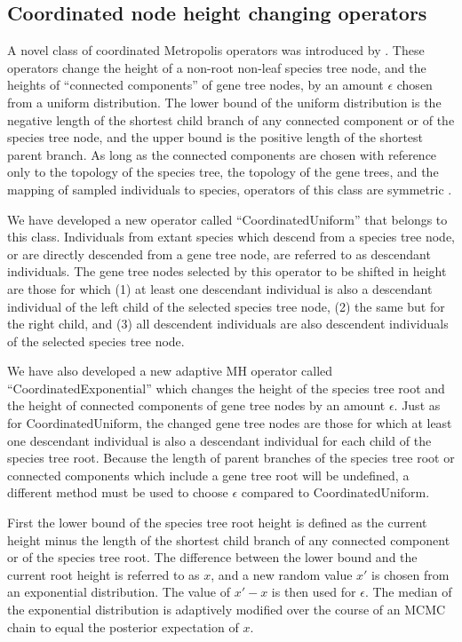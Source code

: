 \documentclass[nogrid]{MBE}%
\begin{document}
\subsection{Coordinated node height changing operators}

A novel class of coordinated Metropolis operators was introduced by
\cite{Jones2016}. These operators change the height of a non-root non-leaf
species tree node, and the heights of ``connected components'' of gene tree
nodes, by an amount $\epsilon$ chosen from a uniform distribution.
The lower bound of the uniform distribution is the negative length of
the shortest child branch of any connected component or of the species tree node,
and the upper bound is the positive length of the shortest parent branch. As
long as the connected components are chosen with reference only to the topology
of the species tree, the topology of the gene trees, and the mapping of
sampled individuals to species, operators of this class are symmetric
\citep{Jones2016}.

We have developed a new operator called ``CoordinatedUniform'' that belongs to
this class. Individuals from extant species which descend from a species tree
node, or are directly descended from a gene tree node, are referred to as
descendant individuals. The gene tree nodes selected by this operator to be shifted in height are those
for which (1) at least one descendant individual is also a descendant individual
of the left child of the selected species tree node, (2) the same but for the right child, and (3) all descendent
individuals are also descendent individuals of the selected species tree node.

We have also developed a new adaptive MH \citep{Andrieu2008} operator called
``CoordinatedExponential'' which changes the height of the species tree root and
the height of connected components of gene tree nodes by an amount $\epsilon$.
Just as for CoordinatedUniform, the changed gene tree nodes are those for which at least one descendant individual
is also a descendant individual for each child of the species tree root.
Because the length of parent branches of the species tree root or connected
components which include a gene tree root will be undefined, a different method must be used to choose
$\epsilon$ compared to CoordinatedUniform.

First the lower bound of the species tree root height is defined as the current
height minus the length of the shortest child branch of any connected component or
of the species tree root. The difference between the lower bound and the current
root height is referred to as $x$, and a new random value $x'$ is chosen from an
exponential distribution. The value of $x' - x$ is then used for $\epsilon$. The
median of the exponential distribution is adaptively modified over the course of
an MCMC chain to equal the posterior expectation of $x$.
\end{document}
